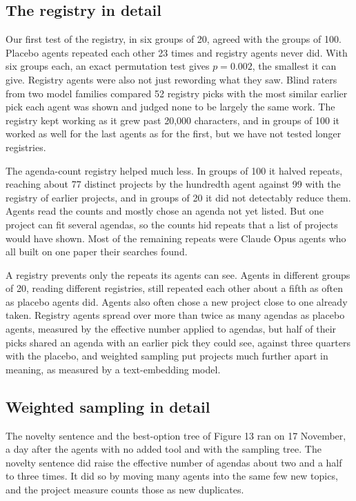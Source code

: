 \documentclass[11pt]{article}
\newcounter{none}
\begin{document}
\subsection{The registry in detail}\label{the-registry-in-detail}

Our first test of the registry, in six groups of 20, agreed with the
groups of 100. Placebo agents repeated each other 23 times and registry
agents never did. With six groups each, an exact permutation test gives
\(p = 0.002\), the smallest it can give. Registry agents were also not
just rewording what they saw. Blind raters from two model families
compared 52 registry picks with the most similar earlier pick each agent
was shown and judged none to be largely the same work. The registry kept
working as it grew past 20,000 characters, and in groups of 100 it
worked as well for the last agents as for the first, but we have not
tested longer registries.

The agenda-count registry helped much less. In groups of 100 it halved
repeats, reaching about 77 distinct projects by the hundredth agent
against 99 with the registry of earlier projects, and in groups of 20 it
did not detectably reduce them. Agents read the counts and mostly chose
an agenda not yet listed. But one project can fit several agendas, so
the counts hid repeats that a list of projects would have shown. Most of
the remaining repeats were Claude Opus agents who all built on one paper
their searches found.

A registry prevents only the repeats its agents can see. Agents in
different groups of 20, reading different registries, still repeated
each other about a fifth as often as placebo agents did. Agents also
often chose a new project close to one already taken. Registry agents
spread over more than twice as many agendas as placebo agents, measured
by the effective number applied to agendas, but half of their picks
shared an agenda with an earlier pick they could see, against three
quarters with the placebo, and weighted sampling put projects much
further apart in meaning, as measured by a text-embedding model.

\subsection{Weighted sampling in
detail}\label{weighted-sampling-in-detail}

The novelty sentence and the best-option tree of Figure 13 ran on 17
November, a day after the agents with no added tool and with the
sampling tree. The novelty sentence did raise the effective number of
agendas about two and a half to three times. It did so by moving many
agents into the same few new topics, and the project measure counts
those as new duplicates.
\end{document}
